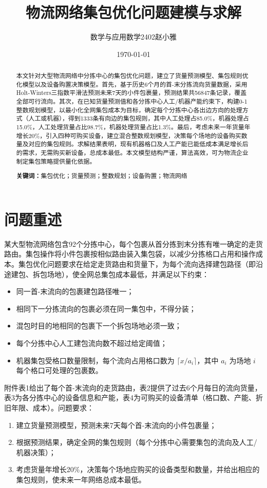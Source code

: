 \documentclass[12pt,a4paper]{ctexart}
\title{物流网络集包优化问题建模与求解}
\author{数学与应用数学2402赵小雅}
\date{\today}
\begin{document}
\maketitle

\begin{abstract}
本文针对大型物流网络中分拣中心的集包优化问题，建立了货量预测模型、集包规则优化模型以及设备购置决策模型。首先，基于历史6个月的首-末分拣流向货量数据，采用Holt-Winters三指数平滑法预测未来7天的小件包裹量，预测结果共56847条记录，覆盖全部可行流向。其次，在已知货量预测值和各分拣中心人工/机器产能约束下，构建0-1整数规划模型，以最小化全网集包成本为目标，确定每个分拣中心各出边方向的处理方式（人工或机器），得到1333条有向边的集包规则，其中人工处理占85.0\%，机器处理占15.0\%，人工处理货量占比98.7\%，机器处理货量占比1.3\%。最后，考虑未来一年货量年增长20\%，引入四种可购买设备，建立混合整数规划模型，决策每个场地的设备购买数量及对应的集包规则。求解结果表明，现有机器格口及人工产能已能低成本满足增长后的需求，无需购买新设备，总成本最低。本文模型结构严谨，算法高效，可为物流企业制定集包策略提供量化依据。

\noindent\textbf{关键词：}集包优化；货量预测；整数规划；设备购置；物流网络
\end{abstract}

\section{问题重述}

某大型物流网络包含92个分拣中心，每个包裹从首分拣到末分拣有唯一确定的走货路由。集包操作将小件包裹按相似路由装入集包袋，以减少分拣格口占用和操作成本。集包优化问题要求在给定走货路由和货量下，为每个流向选择建包路径（即沿途建包、拆包场地），使全网总集包成本最低，并满足以下约束：
\begin{itemize}
    \item 同一首-末流向的包裹建包路径唯一；
    \item 相同下一分拣流向的包裹必须在同一集包中，不得分装；
    \item 混包时目的地相同的包裹下一个拆包场地必须一致；
    \item 每个分拣中心人工建包流向数不超过给定阈值；
    \item 机器集包受格口数量限制，每个流向占用格口数为 $\lceil x/a_i\rceil$，其中 $a_i$ 为场地 $i$ 每个格口可处理的包裹数。
\end{itemize}
附件表1给出了每个首-末流向的走货路由，表2提供了过去6个月每日的流向货量，表3为各分拣中心的设备信息和产能，表4为可购买的设备清单（格口数、产能、折旧年限、成本）。问题要求：
\begin{enumerate}
    \item 建立货量预测模型，预测未来7天每个首-末流向的小件包裹量；
    \item 根据预测结果，确定全网的集包规则（每个分拣中心需要集包的流向及人工/机器决策）；
    \item 考虑货量年增长20\%，决策每个场地应购买的设备类型和数量，并给出相应的集包规则，使未来一年网络总成本最低。
\end{enumerate}
\end{document}
